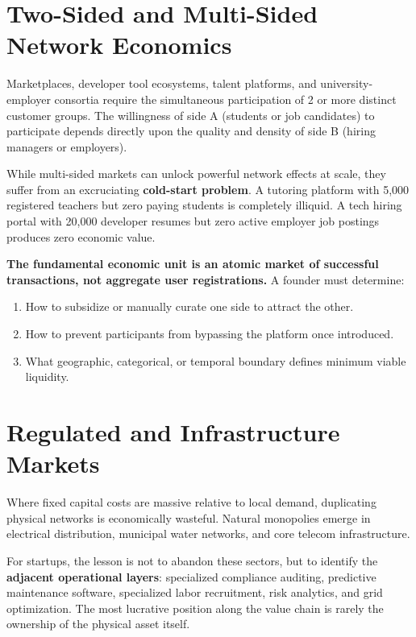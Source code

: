 \section{Two-Sided and Multi-Sided Network Economics}

Marketplaces, developer tool ecosystems, talent platforms, and university-employer consortia require the simultaneous participation of 2 or more distinct customer groups. The willingness of side A (students or job candidates) to participate depends directly upon the quality and density of side B (hiring managers or employers).

While multi-sided markets can unlock powerful network effects at scale, they suffer from an excruciating \textbf{cold-start problem}. A tutoring platform with 5,000 registered teachers but zero paying students is completely illiquid. A tech hiring portal with 20,000 developer resumes but zero active employer job postings produces zero economic value.

\textbf{The fundamental economic unit is an atomic market of successful transactions, not aggregate user registrations.} A founder must determine:
\begin{enumerate}[leftmargin=12pt,itemsep=1pt,topsep=1pt,parsep=0pt]
  \item How to subsidize or manually curate one side to attract the other.
  \item How to prevent participants from bypassing the platform once introduced.
  \item What geographic, categorical, or temporal boundary defines minimum viable liquidity.
\end{enumerate}

\section{Regulated and Infrastructure Markets}

Where fixed capital costs are massive relative to local demand, duplicating physical networks is economically wasteful. Natural monopolies emerge in electrical distribution, municipal water networks, and core telecom infrastructure.

For startups, the lesson is not to abandon these sectors, but to identify the \textbf{adjacent operational layers}: specialized compliance auditing, predictive maintenance software, specialized labor recruitment, risk analytics, and grid optimization. The most lucrative position along the value chain is rarely the ownership of the physical asset itself.

